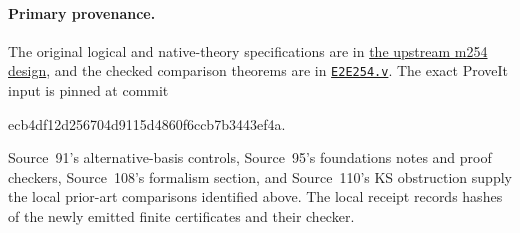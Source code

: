 \paragraph{Primary provenance.}
The original logical and native-theory specifications are in
\href{https://github.com/jeff87654/busy-beaver/tree/zf-254/ZF/m254/design}{the upstream m254 design},
and the checked comparison theorems are in
\href{https://github.com/jeff87654/busy-beaver/blob/zf-254/ZF/m254/coq/e2e/E2E254.v}{\texttt{E2E254.v}}.
The exact ProveIt input is pinned at commit
\begin{center}\small\ttfamily
ecb4df12d256704d9115d4860f6ccb7b3443ef4a.
\end{center}
Source~91's alternative-basis controls, Source~95's foundations notes
and proof checkers, Source~108's formalism section, and Source~110's
KS obstruction supply the local prior-art comparisons identified above.
The local receipt records
hashes of the newly emitted finite certificates and their checker.
